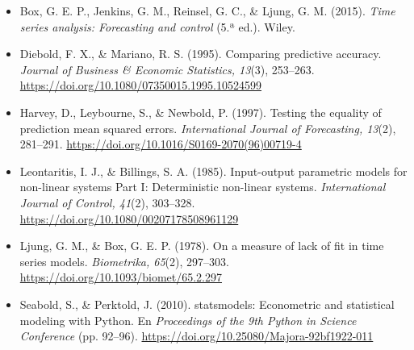 \documentclass[11pt,letterpaper]{article}
\begin{document}
\begin{itemize}
    \setlength{\itemsep}{2pt}
    \item[] Box, G. E. P., Jenkins, G. M., Reinsel, G. C., \& Ljung, G. M. (2015). \textit{Time series analysis: Forecasting and control} (5.ª ed.). Wiley.
    \item[] Diebold, F. X., \& Mariano, R. S. (1995). Comparing predictive accuracy. \textit{Journal of Business \& Economic Statistics, 13}(3), 253--263. \url{https://doi.org/10.1080/07350015.1995.10524599}
    \item[] Harvey, D., Leybourne, S., \& Newbold, P. (1997). Testing the equality of prediction mean squared errors. \textit{International Journal of Forecasting, 13}(2), 281--291. \url{https://doi.org/10.1016/S0169-2070(96)00719-4}
    \item[] Leontaritis, I. J., \& Billings, S. A. (1985). Input-output parametric models for non-linear systems Part I: Deterministic non-linear systems. \textit{International Journal of Control, 41}(2), 303--328. \url{https://doi.org/10.1080/00207178508961129}
    \item[] Ljung, G. M., \& Box, G. E. P. (1978). On a measure of lack of fit in time series models. \textit{Biometrika, 65}(2), 297--303. \url{https://doi.org/10.1093/biomet/65.2.297}
    \item[] Seabold, S., \& Perktold, J. (2010). statsmodels: Econometric and statistical modeling with Python. En \textit{Proceedings of the 9th Python in Science Conference} (pp. 92--96). \url{https://doi.org/10.25080/Majora-92bf1922-011}
\end{itemize}
\end{document}
